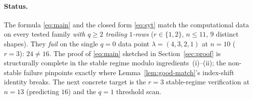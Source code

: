 \documentclass[11pt]{article}
\theoremstyle{definition}
\begin{document}
\paragraph{Status.} The formula \eqref{eq:main} and the closed form
\eqref{eq:syt} match the computational data on every tested family
\emph{with $q \ge 2$ trailing $1$-rows} ($r \in \{1, 2\}$,
$n \le 11$, $9$ distinct shapes). They \emph{fail} on the single $q = 0$
data point $\lambda = (4, 3, 2, 1)$ at $n = 10$ ($r = 3$): $24 \ne 16$.
The proof of \eqref{eq:main} sketched in Section~\ref{sec:proof} is
structurally complete in the stable regime modulo
ingredients~(i)--(ii); the non-stable failure pinpoints exactly where
Lemma~\ref{lem:good-match}'s index-shift identity breaks. The next
concrete target is the $r = 3$ stable-regime verification at $n = 13$
(predicting $16$) and the $q = 1$ threshold scan.
\end{document}

